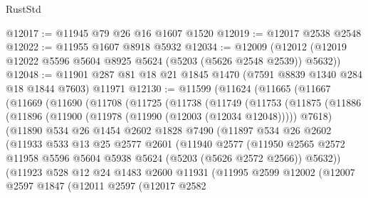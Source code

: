 \begin{lexlean}{RustStd}
\begin{coremodule}
@12017 := @11945 @79 @26 @16 @1607 @1520
@12019 := @12017 @2538 @2548
@12022 := @11955 @1607 @8918 @5932
@12034 := @12009 (@12012 (@12019 @12022 @5596 @5604 @8925 @5624 (@5203 (@5626 @2548 @2539)) @5632))
@12048 := @11901 @287 @81 @18 @21 @1845 @1470 (@7591 @8839 @1340 @284 @18 @1844 @7603) @11971
@12130 := @11599
    (@11624
      (@11665
        (@11667
          (@11669
            (@11690
              (@11708
                (@11725
                  (@11738
                    (@11749
                      (@11753
                        (@11875
                          (@11886
                            (@11896 (@11900 (@11978 (@11990 (@12003 (@12034 @12048))))) @7618)
                            (@11890
                              @534
                              @26
                              @1454
                              @2602
                              @1828
                              @7490
                              (@11897
                                @534
                                @26
                                @2602
                                (@11933
                                  @533
                                  @13
                                  @25
                                  @2577
                                  @2601
                                  (@11940
                                    @2577
                                    (@11950
                                      @2565
                                      @2572
                                      @11958
                                      @5596
                                      @5604
                                      @5938
                                      @5624
                                      (@5203 (@5626 @2572 @2566))
                                      @5632))
                                  (@11923
                                    @528
                                    @12
                                    @24
                                    @1483
                                    @2600
                                    @11931
                                    (@11995
                                      @2599
                                      @12002
                                      (@12007
                                        @2597
                                        @1847
                                        (@12011
                                          @2597
                                          (@12017
                                            @2582

\end{coremodule}
\end{lexlean}
